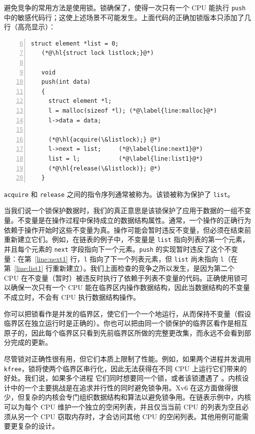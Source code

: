 避免竞争的常用方法是使用锁。锁确保了，使得一次只有一个 CPU 能执行 \lstinline{push} 中的敏感代码行；这使上述场景不可能发生。上面代码的正确加锁版本只添加了几行（高亮显示）：
\begin{lstlisting}[numbers=left,firstnumber=6]
   struct element *list = 0;
   (*@\hl{struct lock listlock;}@*)
    	
   void
   push(int data)
   {
     struct element *l;
     l = malloc(sizeof *l); (*@\label{line:malloc}@*)
     l->data = data;
   
     (*@\hl{acquire(\&listlock);} @*)
     l->next = list;     (*@\label{line:next1}@*)
     list = l;           (*@\label{line:list1}@*)
     (*@\hl{release(\&listlock)}; @*)
   }
\end{lstlisting}
\lstinline{acquire} 和 \lstinline{release} 之间的指令序列通常被称为。该锁被称为保护了 \lstinline{list}。

当我们说一个锁保护数据时，我们的真正意思是该锁保护了应用于数据的一组不变量。不变量是在操作过程中保持成立的数据结构属性。通常，一个操作的正确行为依赖于操作开始时这些不变量为真。操作可能会暂时违反不变量，但必须在结束前重新建立它们。例如，在链表的例子中，不变量是 \lstinline{list} 指向列表的第一个元素，并且每个元素的 \lstinline{next} 字段指向下一个元素。\lstinline{push} 的实现暂时违反了这个不变量：在第~\ref{line:next1} 行，\lstinline{l} 指向了下一个列表元素，但 \lstinline{list} 尚未指向 \lstinline{l}（在第~\ref{line:list1} 行重新建立）。我们上面检查的竞争之所以发生，是因为第二个 CPU 在不变量（暂时）被违反时执行了依赖于列表不变量的代码。正确使用锁可以确保一次只有一个 CPU 能在临界区内操作数据结构，因此当数据结构的不变量不成立时，不会有 CPU 执行数据结构操作。

你可以把锁看作是并发的临界区，使它们一个一个地运行，从而保持不变量（假设临界区在独立运行时是正确的）。你也可以把由同一个锁保护的临界区看作是相互原子的，因此每个临界区只看到先前临界区所做的完整更改集，而永远不会看到部分完成的更新。

尽管锁对正确性很有用，但它们本质上限制了性能。例如，如果两个进程并发调用 {\tt kfree}，锁将使两个临界区串行化，因此无法获得在不同 CPU 上运行它们带来的好处。我们说，如果多个进程  它们同时想要同一个锁，或者该锁遭遇了 。内核设计中的一个主要挑战是在追求并行性的同时避免锁争用。Xv6 在这方面做得很少，但复杂的内核会专门组织数据结构和算法以避免锁争用。在链表示例中，内核可以为每个 CPU 维护一个独立的空闲列表，并且仅当当前 CPU 的列表为空且必须从另一个 CPU 窃取内存时，才会访问其他 CPU 的空闲列表。其他用例可能需要更复杂的设计。

